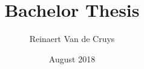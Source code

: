 \documentclass[]{report}
\begin{document}
\title{Bachelor Thesis}
\author{Reinaert Van de Cruys}
\date{August 2018}
\maketitle



\tableofcontents








\printbibliography

\appendix


\end{document}
